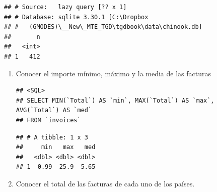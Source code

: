 \documentclass[]{book}
\newenvironment{Shaded}{\begin{snugshade}}{\end{snugshade}}
\newcommand{\KeywordTok}[1]{\textcolor[rgb]{0.13,0.29,0.53}{\textbf{#1}}}
\newcommand{\DataTypeTok}[1]{\textcolor[rgb]{0.13,0.29,0.53}{#1}}
\newcommand{\StringTok}[1]{\textcolor[rgb]{0.31,0.60,0.02}{#1}}
\newcommand{\OtherTok}[1]{\textcolor[rgb]{0.56,0.35,0.01}{#1}}
\newcommand{\OperatorTok}[1]{\textcolor[rgb]{0.81,0.36,0.00}{\textbf{#1}}}
\newcommand{\NormalTok}[1]{#1}
\begin{document}
\begin{verbatim}
## # Source:   lazy query [?? x 1]
## # Database: sqlite 3.30.1 [C:\Dropbox
## #   (GMODES)\__New\_MTE_TGD\tgdbook\data\chinook.db]
##       n
##   <int>
## 1   412
\end{verbatim}

\begin{enumerate}
\def\labelenumi{\arabic{enumi}.}
\item
  Conocer el importe mínimo, máximo y la media de las facturas

\begin{Shaded}
\end{Shaded}

\begin{verbatim}
## <SQL>
## SELECT MIN(`Total`) AS `min`, MAX(`Total`) AS `max`, AVG(`Total`) AS `med`
## FROM `invoices`
\end{verbatim}

\begin{Shaded}
\end{Shaded}

\begin{verbatim}
## # A tibble: 1 x 3
##     min   max   med
##   <dbl> <dbl> <dbl>
## 1  0.99  25.9  5.65
\end{verbatim}
\item
  Conocer el total de las facturas de cada uno de los países.

\begin{Shaded}
\end{Shaded}


\end{enumerate}
\end{document}
